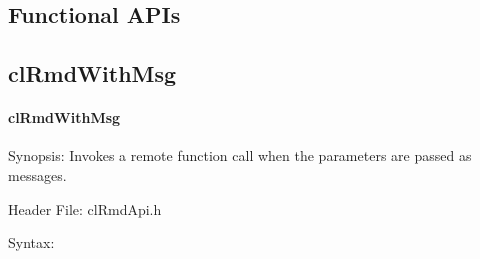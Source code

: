 \begin{flushleft}
\newpage

\section{Functional APIs}
\subsection{clRmdWithMsg}
\hypertarget{pagermd103}{}\paragraph{cl\-Rmd\-With\-Msg}\label{pagermd103}
\begin{Desc}
\item[Synopsis:]Invokes a remote function call when the parameters are passed as messages. \end{Desc}
\begin{Desc}
\item[Header File:]clRmdApi.h\end{Desc}
\begin{Desc}
\item[Syntax:]


\end{Desc}
\end{flushleft}
